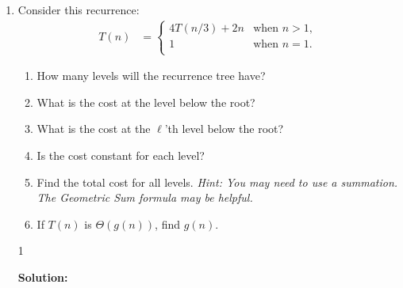 \documentclass[9pt]{article}
\def\solutions{1}
\begin{document}
\begin{enumerate}
\vspace{5mm}

\item Consider this recurrence:
  \begin{align*}
    T(n) & = \begin{cases}
      4T(n/3)+2n & \text{when } n > 1, \\
      1 & \text{when } n = 1. \\
    \end{cases}
  \end{align*}
  \begin{enumerate}
  \item How many levels will the recurrence tree have?
  \item What is the cost at the level below the root?
  \item What is the cost at the $\ell$'th level below the root?
  \item Is the cost constant for each level?
  \item Find the total cost for all levels.  \emph{Hint: You may need to use a summation.  The Geometric Sum formula may be helpful.}
  \item If $T(n)$ is $\Theta(g(n))$, find $g(n)$.
  \end{enumerate}

\if\solutions1
\vspace{2mm}

\textbf{Solution:} \\


\fi
\newpage



\vspace{5mm}


\end{enumerate}
\end{document}
